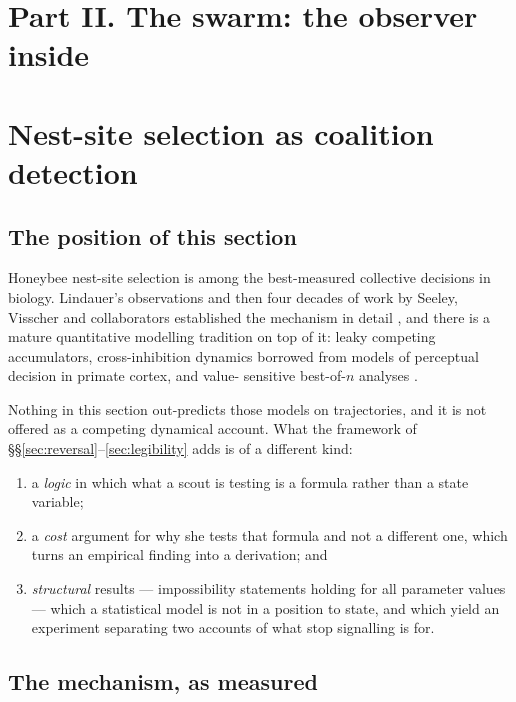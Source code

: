 \documentclass[11pt,a4paper]{article}
\theoremstyle{plain}
\theoremstyle{definition}
\theoremstyle{remark}
\begin{document}
\section*{Part II. The swarm: the observer inside}

\section{Nest-site selection as coalition detection}\label{sec:swarm}

\subsection{The position of this section}

Honeybee nest-site selection is among the best-measured collective decisions in
biology. Lindauer's observations and then four decades of work by Seeley,
Visscher and collaborators established the mechanism in detail
\cite{Seeley10,SB99,SV04}, and there is a mature quantitative modelling
tradition on top of it: leaky competing accumulators, cross-inhibition dynamics
borrowed from models of perceptual decision in primate cortex, and value-
sensitive best-of-$n$ analyses \cite{Seeley12,Pais13,Reina17}.

Nothing in this section out-predicts those models on trajectories, and it is
not offered as a competing dynamical account. What the framework of
\S\S\ref{sec:reversal}--\ref{sec:legibility} adds is of a different kind:
\begin{enumerate}[label=(\roman*),leftmargin=2em]
\item a \emph{logic} in which what a scout is testing is a formula rather than
      a state variable;
\item a \emph{cost} argument for why she tests that formula and not a
      different one, which turns an empirical finding into a derivation; and
\item \emph{structural} results --- impossibility statements holding for all
      parameter values --- which a statistical model is not in a position to
      state, and which yield an experiment separating two accounts of what
      stop signalling is for.
\end{enumerate}

\subsection{The mechanism, as measured}
\end{document}
